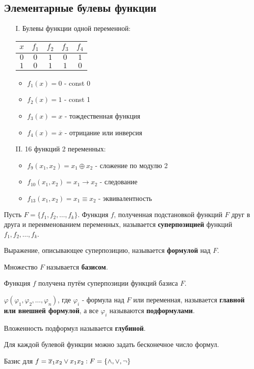 \documentclass[10pt]{article}
\begin{document}
\subsection*{Элементарные булевы функции}
\begin{itemize}
    \item[I.] Булевы функции одной переменной:
        \par
        \begin{tabular}{|c|c|c|c|c|}
            \hline
            $x$ & $f_1$ & $f_2$ & $f_3$ & $f_4$ \\
            \hline
            $0$ & $0$ & $1$ & $0$ & $1$ \\
            $1$ & $0$ & $1$ & $1$ & $0$ \\
            \hline
        \end{tabular}
        \begin{itemize}
            \item $f_1(x) = 0$ - const 0
            \item $f_2(x) = 1$ - const 1
            \item $f_3(x) = x$ - тождественная функция
            \item $f_4(x) = \overline x$ - отрицание или инверсия
        \end{itemize}
    \item[II.] 16 функций 2 переменных:
        \begin{itemize}
            \item $f_9(x_1, x_2) = x_1 \oplus x_2$ - сложение по модулю 2
            \item $f_{10}(x_1, x_2) = x_1 \rightarrow x_2$ - следование
            \item $f_{13}(x_1, x_2) = x_1 \equiv x_2$ - эквивалентность
        \end{itemize}
\end{itemize}

\par Пусть $F = \{ f_1, f_2, \dots, f_{k} \}$. Функция $f$, полученная подстановкой функций $F$ друг в друга и переименованием переменных, называется \textbf{суперпозицией} функций $f_1, f_2, \dots, f_{k}$.
\par Выражение, описывающее суперпозицию, называется \textbf{формулой} над $F$.
\par Множество $F$ называется \textbf{базисом}.
\par Функция $f$ получена путём суперпозиции функций базиса $F$.

\par $\varphi(\varphi_1, \varphi_2, \dots, \varphi_n)$, где $\varphi_i$ - формула над $F$ или переменная, называется \textbf{главной или внешней формулой}, а все $\varphi_i$ называются \textbf{подформулами}.
\par Вложенность подформул называется \textbf{глубиной}.
\par Для каждой булевой функции можно задать бесконечное число формул.
\par Базис для $f = \overline x_1 x_2 \lor x_1 x_2: \space F = \{ \land, \lor, \neg \}$
\end{document}
